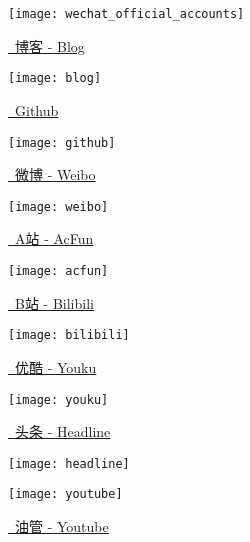 \vspace*{-1.5ex}
\begin{figure}[h!]
    \begin{center}
        \texttt{[image: wechat\_official\_accounts]}
    \end{center}
    \vspace*{-6ex}

    \begin{minipage}[t]{0.22\textwidth}
        \caption*{\href{https://mister-kin.github.io}{\faBook\ 博客 - Blog}}
        \texttt{[image: blog]}
    \end{minipage}
    \quad
    \begin{minipage}[t]{0.22\textwidth}
        \caption*{\href{https://github.com/mister-kin}{\faGithub\ Github}}
        \texttt{[image: github]}
    \end{minipage}
    \quad
    \begin{minipage}[t]{0.22\textwidth}
        \caption*{\href{https://weibo.com/6270111192/profile?topnav=1&wvr=6&is_all=1}{\faWeibo\ 微博 - Weibo}}
        \texttt{[image: weibo]}
    \end{minipage}
    \quad
    \begin{minipage}[t]{0.22\textwidth}
        \caption*{\href{https://www.acfun.cn/u/73269306}{\faUserAstronaut\ A站 - AcFun}}
        \texttt{[image: acfun]}
    \end{minipage}

    \vspace*{1ex}

    \begin{minipage}[t]{0.22\textwidth}
        \caption*{\href{http://space.bilibili.com/17025250?}{\faTv\ B站 - Bilibili}}
        \texttt{[image: bilibili]}
    \end{minipage}
    \quad
    \begin{minipage}[t]{0.22\textwidth}
        \caption*{\href{http://i.youku.com/i/UNjA3MTk5Mjgw?spm=a2hzp.8253869.0.0}{\faChevronCircleRight\ 优酷 - Youku}}
        \texttt{[image: youku]}
    \end{minipage}
    \quad
    \begin{minipage}[t]{0.22\textwidth}
        \caption*{\href{https://www.toutiao.com/c/user/835254071079053/\#mid=1663279303982091}{\faNewspaper[regular]\ 头条 - Headline}}
        \texttt{[image: headline]}
    \end{minipage}
    \quad
    \begin{minipage}[t]{0.22\textwidth}
        \caption*{\href{https://www.youtube.com/channel/UCXqjfWLzMlRKxGC8syWj17Q?view_as=public}{\faYoutube\ 油管 - Youtube}}
        \texttt{[image: youtube]}
    \end{minipage}
\end{figure}
